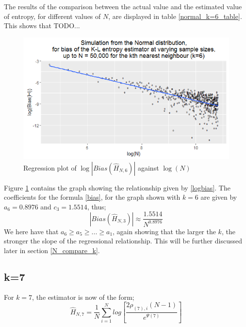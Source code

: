 \documentclass{report}
\begin{document}
The results of the comparison between the actual value and the estimated value of entropy, for different values of $N$, are displayed in table \ref{normal_k=6_table}. This shows that TODO...

\begin{figure}
  \begin{center}
    \includegraphics[width=\textwidth]{./Graphs/new_normal_k=6.png}
  \end{center}
\caption{Regression plot of $\log|Bias(\hat{H}_{N, 6})|$ against $\log(N)$}
  \label{normal_k=6_graph}
\end{figure}

Figure \ref{normal_k=6_graph} contains the graph showing the relationship given by \ref{logbias}. The coefficients for the formula \ref{bias}, for the graph shown with $k=6$ are given by $a_{6} = 0.8976$ and $c_{3} = 1.5514$, thus;
\begin{equation}
|Bias(\hat{H}_{N, 3})| \approx \frac{1.5514}{N^{0.8976}} \nonumber
\end{equation}
We here have that $a_{6} \geq a_{5} \geq ... \geq a_{1}$, again showing that the larger the $k$, the stronger the slope of the regressional relationship. This will be further discussed later in section \ref{N_compare_k}.




\subsection{k=7} \label{N_k=7}
For $k=7$, the estimator is now of the form;
\begin{equation}
\hat{H}_{N, 7} = \frac{1}{N} \sum_{i=1}^{N} log \left[ \frac{2\rho_{(7),i} (N-1)}{e^{\Psi(7)}} \right] \nonumber
\end{equation}
\end{document}
